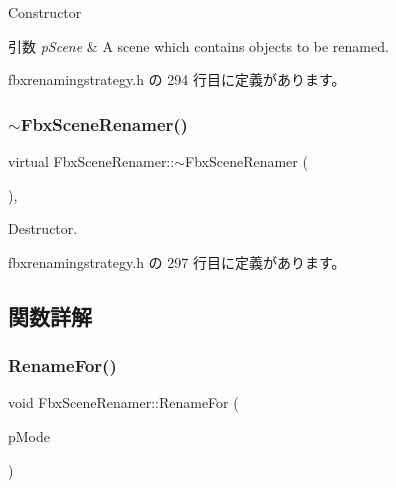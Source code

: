 Constructor 
\begin{DoxyParams}{引数}
{\em p\+Scene} & A scene which contains objects to be renamed. \\
\hline
\end{DoxyParams}


 fbxrenamingstrategy.\+h の 294 行目に定義があります。

\mbox{\label{class_fbx_scene_renamer_a68ee26ac24c461b9b11085feec2094f4}} 
\subsubsection{\texorpdfstring{$\sim$\+Fbx\+Scene\+Renamer()}{~FbxSceneRenamer()}}
{\footnotesize\ttfamily virtual Fbx\+Scene\+Renamer\+::$\sim$\+Fbx\+Scene\+Renamer (\begin{DoxyParamCaption}{ }\end{DoxyParamCaption})\hspace{0.3cm}{\ttfamily [inline]}, {\ttfamily [virtual]}}



Destructor. 



 fbxrenamingstrategy.\+h の 297 行目に定義があります。



\subsection{関数詳解}
\mbox{\label{class_fbx_scene_renamer_a08a9c3b587efe5422bd5b79f01b42e6d}} 
\subsubsection{\texorpdfstring{Rename\+For()}{RenameFor()}}
{\footnotesize\ttfamily void Fbx\+Scene\+Renamer\+::\+Rename\+For (\begin{DoxyParamCaption}\item[{\hyperlink{class_fbx_scene_renamer_a9279ee1a645d6499b934adbc376f8678}{E\+Renaming\+Mode}}]{p\+Mode }\end{DoxyParamCaption})}


